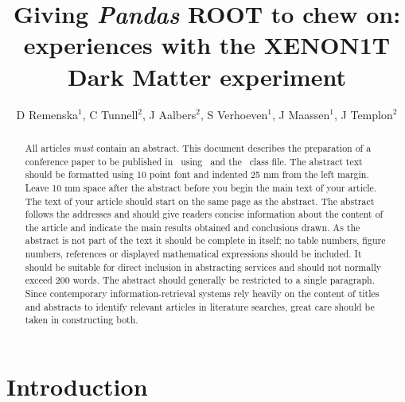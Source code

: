\documentclass[a4paper]{jpconf}
\begin{document}
\def\code#1{\texttt{#1}}
\title{Giving \textit{Pandas} ROOT to chew on: experiences with the XENON1T Dark Matter experiment}

\author{D Remenska$^{1}$, C Tunnell$^{2}$, J Aalbers$^{2}$, S Verhoeven$^{1}$, J Maassen$^{1}$, J Templon$^{2}$}
\address{$^{1}$Netherlands eScience Center, Science Park 140, Amsterdam, The 
Netherlands}
\address{$^{2}$National Institute for High Energy Physics (NIKHEF), Science 
Park 
105, Amsterdam, The Netherlands}

\begin{abstract}
All articles {\it must} contain an abstract. This document describes the  
preparation of a conference paper to be published in \jpcs\ using \LaTeXe\ and 
the \cls\ class file. The abstract text should be formatted using 10 point font 
and indented 25 mm from the left margin. Leave 10 mm space after the abstract 
before you begin the main text of your article. The text of your article should 
start on the same page as the abstract. The abstract follows the addresses and 
should give readers concise information about the content of the article and 
indicate the main results obtained and conclusions drawn. As the abstract is 
not 
part of the text it should be complete in itself; no table numbers, figure 
numbers, references or displayed mathematical expressions should be included. 
It 
should be suitable for direct inclusion in abstracting services and should not 
normally exceed 200 words. The abstract should generally be restricted to a 
single paragraph. Since contemporary information-retrieval systems rely heavily 
on the content of titles and abstracts to identify relevant articles in 
literature searches, great care should be taken in constructing both.
\end{abstract}

\section{Introduction}

\lipsum[1-2]
\end{document}
